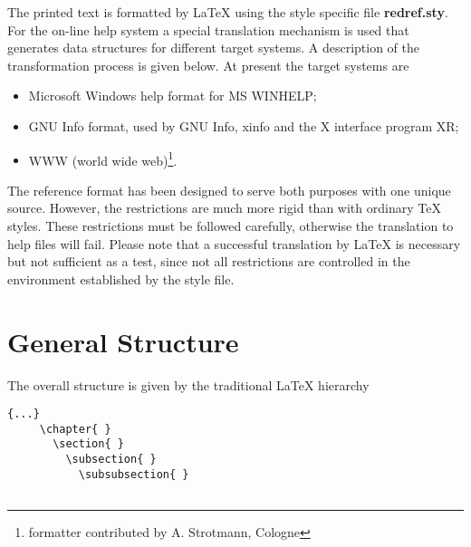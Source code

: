 The printed text is formatted by \LaTeX{} using the style specific file {\bf %
redref.sty}. For the on-line help system a special translation mechanism is
used that generates data structures for different target systems. A
description of the transformation process is given below. At present the
target systems are

\begin{itemize}
\item  Microsoft Windows help format for MS WINHELP;

\item  GNU Info format, used by GNU Info, xinfo and the \REDUCE X interface
program XR;

\item  WWW (world wide web)\footnote{%
formatter contributed by A. Strotmann, Cologne}.
\end{itemize}

The reference format has been designed to serve both purposes with one
unique source. However, the restrictions are much more rigid than with
ordinary \TeX{} styles. These restrictions must be followed carefully,
otherwise the translation to help files will fail. Please note that a
successful translation by \LaTeX{} is necessary but not sufficient as a
test, since not all restrictions are controlled in the environment
established by the style file.

\section{General Structure}

The overall structure is given by the traditional \LaTeX{} hierarchy 
\begin{verbatim}
{...}
     \chapter{ }
       \section{ }
         \subsection{ }
           \subsubsection{ }
  
\end{verbatim}

